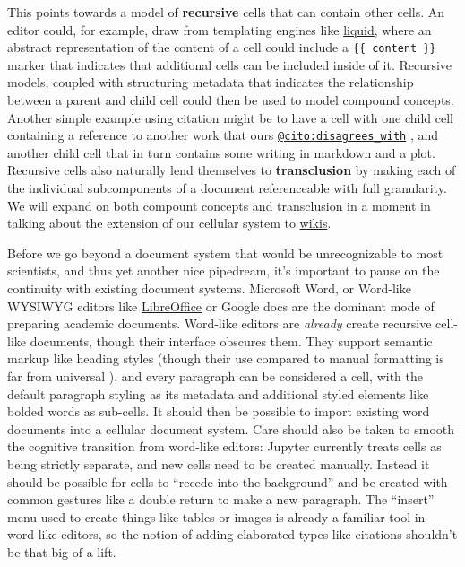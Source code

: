 This points towards a model of \textbf{recursive} cells that can contain
other cells. An editor could, for example, draw from templating engines
like \href{https://shopify.github.io/liquid/}{liquid}, where an abstract
representation of the content of a cell could include a
\texttt{\{\{\ content\ \}\}} marker that indicates that additional cells
can be included inside of it. Recursive models, coupled with structuring
metadata that indicates the relationship between a parent and child cell
could then be used to model compound concepts. Another simple example
using citation might be to have a cell with one child cell containing a
reference to another work that ours
\href{https://sparontologies.github.io/cito/current/cito.html\#d4e449}{\texttt{@cito:disagrees\_with}}
\citep{peroniFaBiOCiTOOntologies2012} , and another child cell
that in turn contains some writing in markdown and a plot. Recursive
cells also naturally lend themselves to \textbf{transclusion} by making
each of the individual subcomponents of a document referenceable with
full granularity. We will expand on both compount concepts and
transclusion in a moment in talking about the extension of our cellular
system to \protect\hyperlink{trackers-clients--wikis}{wikis}.

Before we go beyond a document system that would be unrecognizable to
most scientists, and thus yet another nice pipedream, it's important to
pause on the continuity with existing document systems. Microsoft Word,
or Word-like WYSIWYG editors like
\href{https://www.libreoffice.org/}{LibreOffice} or Google docs are the
dominant mode of preparing academic documents. Word-like editors are
\emph{already} create recursive cell-like documents, though their
interface obscures them. They support semantic markup like heading
styles (though their use compared to manual formatting is far from
universal \citep{sorgaardUseParagraphStyles1996} ), and every
paragraph can be considered a cell, with the default paragraph styling
as its metadata and additional styled elements like bolded words as
sub-cells. It should then be possible to import existing word documents
into a cellular document system. Care should also be taken to smooth the
cognitive transition from word-like editors: Jupyter currently treats
cells as being strictly separate, and new cells need to be created
manually. Instead it should be possible for cells to ``recede into the
background'' and be created with common gestures like a double return to
make a new paragraph. The ``insert'' menu used to create things like
tables or images is already a familiar tool in word-like editors, so the
notion of adding elaborated types like citations shouldn't be that big
of a lift.

